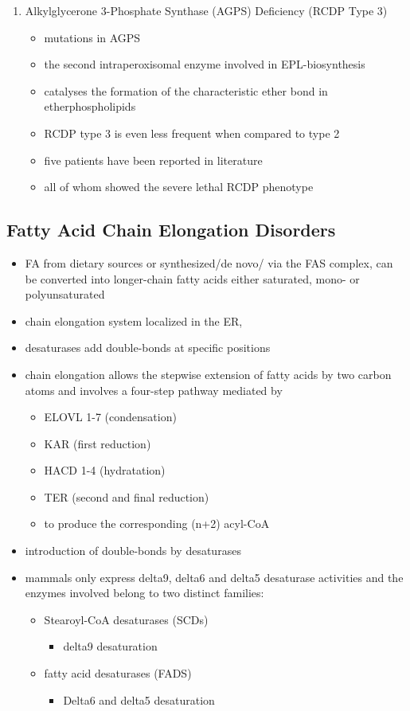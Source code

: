 \documentclass{scrartcl}
\begin{document}
\begin{enumerate}
\item Alkylglycerone 3-Phosphate Synthase (AGPS) Deficiency (RCDP Type 3)
\label{sec:orgfdbbc26}
\begin{itemize}
\item mutations in AGPS
\item the second intraperoxisomal enzyme involved in EPL-biosynthesis
\item catalyses the formation of the characteristic ether bond in etherphospholipids
\item RCDP type 3 is even less frequent when compared to type 2
\item five patients have been reported in literature
\item all of whom showed the severe lethal RCDP phenotype
\end{itemize}
\end{enumerate}
\subsection{Fatty Acid Chain Elongation Disorders}
\label{sec:org3af1c39}
\begin{itemize}
\item FA from dietary sources or synthesized/de novo/ via the FAS complex,
can be converted into longer-chain fatty acids either saturated,
mono- or polyunsaturated
\item chain elongation system localized in the ER,
\item desaturases add double-bonds at specific positions
\item chain elongation allows the stepwise extension of fatty acids by two
carbon atoms and involves a four-step pathway mediated by
\begin{itemize}
\item ELOVL 1-7 (condensation)
\item KAR (first reduction)
\item HACD 1-4 (hydratation)
\item TER (second and final reduction)
\item to produce the corresponding (n+2) acyl-CoA
\end{itemize}
\item introduction of double-bonds by desaturases
\item mammals only express delta9, delta6 and delta5 desaturase activities
and the enzymes involved belong to two distinct families:
\begin{itemize}
\item Stearoyl-CoA desaturases (SCDs)
\begin{itemize}
\item delta9 desaturation
\end{itemize}
\item fatty acid desaturases (FADS)
\begin{itemize}
\item Delta6 and delta5 desaturation
\end{itemize}
\end{itemize}
\end{itemize}
\end{document}
